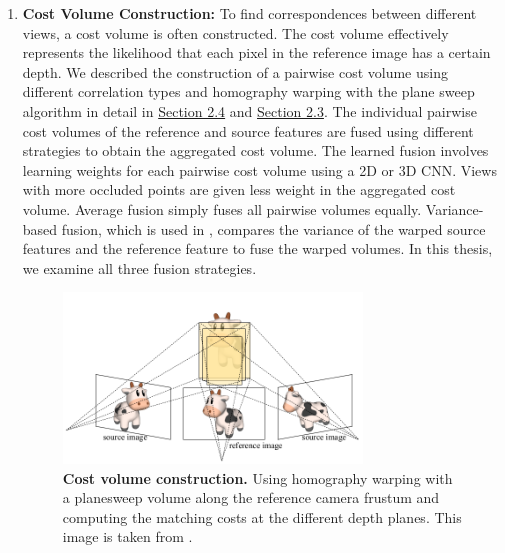 \begin{enumerate}
\item \textbf{Cost Volume Construction:} To find correspondences between different views, a cost volume is often constructed. The cost volume effectively represents the likelihood that each pixel in the reference image has a certain depth. We described the construction of a pairwise cost volume using different correlation types and homography warping with the plane sweep algorithm in detail in \hyperref[sec:multiviewster]{Section 2.4} and \hyperref[sec:depthestim]{Section 2.3}. The individual pairwise cost volumes of the reference and source features are fused using different strategies to obtain the aggregated cost volume. The learned fusion involves learning weights for each pairwise cost volume using a 2D or 3D CNN. Views with more occluded points are given less weight in the aggregated cost volume. Average fusion simply fuses all pairwise volumes equally. Variance-based fusion, which is used in {\mvsn} \cite{Yao2018}, compares the variance of the warped source features and the reference feature to fuse the warped volumes. In this thesis, we examine all three fusion strategies. 
\begin{figure}[ht]
\centering
     \includegraphics[width=0.75\textwidth]{images/cvc.png}
      \caption[Cost volume construction]{\textbf{Cost volume construction.} Using homography warping with a planesweep volume along the reference camera frustum and computing the matching costs at the different depth planes. This image is taken from \cite{zhu2021deep}.} 
       \label{fig:cvc}
\end{figure}

\end{enumerate}
